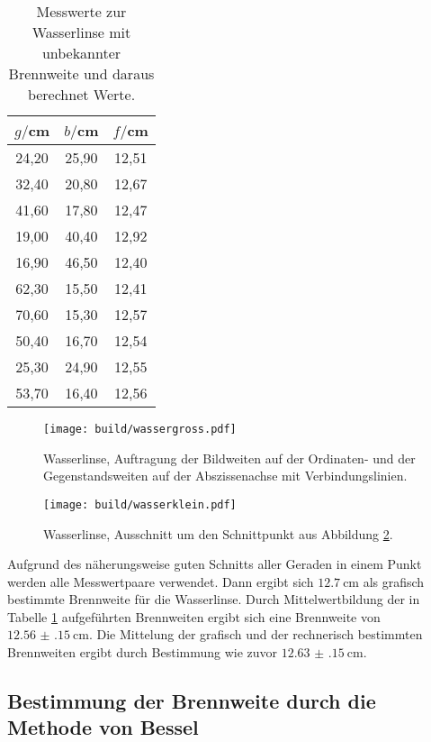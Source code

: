 \begin{table}[htp]
	\begin{center}
    \caption{Messwerte zur Wasserlinse mit unbekannter Brennweite und daraus berechnet Werte.}
    \label{tab:unbekannt}
		\begin{tabular}{ccc}
		\toprule
			{$g/$cm} & {$b/$cm} & {$f/$cm}\\
			\midrule
			24,20 & 25,90 & 12,51\\
			32,40 & 20,80 & 12,67\\
			41,60 & 17,80 & 12,47\\
			19,00 & 40,40 & 12,92\\
			16,90 & 46,50 & 12,40\\
			62,30 & 15,50 & 12,41\\
			70,60 & 15,30 & 12,57\\
			50,40 & 16,70 & 12,54\\
			25,30 & 24,90 & 12,55\\
			53,70 & 16,40 & 12,56\\
		\bottomrule
		\end{tabular}
	\end{center}
\end{table}

\begin{figure}%
  \centering
  \texttt{[image: build/wassergross.pdf]}
  \caption{Wasserlinse, Auftragung der Bildweiten auf der Ordinaten- und der Gegenstandsweiten auf der Abszissenachse mit Verbindungslinien.}
  \label{fig:wassergross}
\end{figure}

\begin{figure}%
  \centering
  \texttt{[image: build/wasserklein.pdf]}
  \caption{Wasserlinse, Ausschnitt um den Schnittpunkt aus Abbildung \ref{fig:wasserklein}.}
  \label{fig:wasserklein}
\end{figure}

Aufgrund des näherungsweise guten Schnitts aller Geraden in einem Punkt werden alle
Messwertpaare verwendet. Dann ergibt sich $\SI{12.7}{\centi\meter}$ als grafisch bestimmte
Brennweite für die Wasserlinse. Durch Mittelwertbildung der in Tabelle \ref{tab:unbekannt}
aufgeführten Brennweiten ergibt sich eine Brennweite von $\SI{12.56(15)}{\centi\meter}$.
Die Mittelung der grafisch und der rechnerisch bestimmten Brennweiten
ergibt durch Bestimmung wie zuvor $\SI{12.63(15)}{\centi\meter}$.

\subsection{Bestimmung der Brennweite durch die Methode von Bessel}


